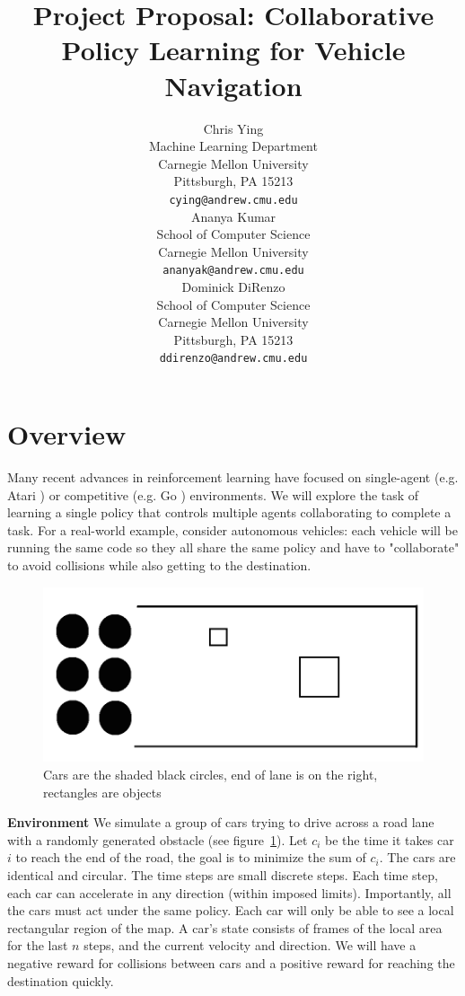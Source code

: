 \documentclass{article}
\title{Project Proposal: Collaborative Policy Learning for Vehicle Navigation}
\author{
    Chris Ying \\
      Machine Learning Department \\
        Carnegie Mellon University\\
          Pittsburgh, PA 15213 \\
            \texttt{cying@andrew.cmu.edu} \\
                \And
                  Ananya Kumar \\
                    School of Computer Science \\
                      Carnegie Mellon University \\
                        \texttt{ananyak@andrew.cmu.edu} \\
                          \AND
                            Dominick DiRenzo \\
                              School of Computer Science  \\
                                Carnegie Mellon University \\
                                  Pittsburgh, PA 15213 \\
                                    \texttt{ddirenzo@andrew.cmu.edu} \\
}
\begin{document}

\maketitle

\section{Overview}

Many recent advances in reinforcement learning have focused on single-agent (e.g. Atari \cite{DBLP:journals/corr/MnihKSGAWR13}) or competitive (e.g. Go \cite{silver2016mastering}) environments. We will explore the task of learning a single policy that controls multiple agents collaborating to complete a task. For a real-world example, consider autonomous vehicles: each vehicle will be running the same code so they all share the same policy and have to "collaborate" to avoid collisions while also getting to the destination.

\begin{figure}[h!]
\includegraphics[scale=0.25]{coop_game}
\centering
\caption{Cars are the shaded black circles, end of lane is on the right, rectangles are objects}
\label{fig:coop_game}
\end{figure}

\textbf{Environment} We simulate a group of cars trying to drive across a road lane with a randomly generated obstacle (see figure~\ref{fig:coop_game}). Let $c_i$ be the time it takes car $i$ to reach the end of the road, the goal is to minimize the sum of $c_i$. The cars are identical and circular. The time steps are small discrete steps. Each time step, each car can accelerate in any direction (within imposed limits). Importantly, all the cars must act under the same policy. Each car will only be able to see a local rectangular region of the map. A car's state consists of frames of the local area for the last $n$ steps, and the current velocity and direction. We will have a negative reward for collisions between cars and a positive reward for reaching the destination quickly.
\end{document}
